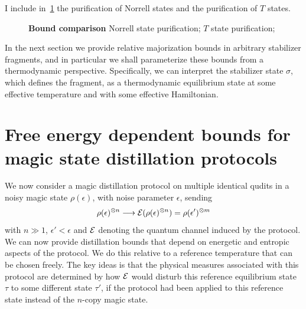 \documentclass[pra,
aps,
twocolumn,
superscriptaddress,
groupedaddress,
nofootinbib,
reprint
]{revtex4-1}
\begin{document}
I include in~\cref{fig:test} the purification of Norrell states and the purification of $T$ states.

\begin{figure}[h]
    \centering
    \hspace{8pt}%
    \caption{\textbf{Bound comparison} 
     Norrell state purification;  $T$ state purification;
    }%
    \label{fig:test}
\end{figure}

In the next section we provide relative majorization bounds in arbitrary stabilizer fragments, and in particular we shall parameterize these bounds from a thermodynamic perspective. Specifically, we can interpret the stabilizer state $\sigma$, which defines the fragment, as a thermodynamic equilibrium state at some effective temperature and with some effective Hamiltonian.

\section{Free energy dependent bounds for magic state distillation protocols}
\label{sec:stab}

We now consider a magic distillation protocol on multiple identical qudits in a noisy magic state $\rho(\epsilon)$, with noise parameter $\epsilon$, sending 
\begin{equation}
\rho(\epsilon)^{\otimes n} \longrightarrow \mathcal{E}(\rho(\epsilon)^{\otimes n}) =\rho(\epsilon')^{\otimes m}
\end{equation}
with $n \gg 1$, $\epsilon' <\epsilon$ and $\mathcal{E}$ denoting the quantum channel induced by the protocol. We can now provide distillation bounds that depend on energetic and entropic aspects of the protocol. We do this relative to a reference temperature that can be chosen freely. The key ideas is that the physical measures associated with this protocol are determined by how $\mathcal{E}$ would disturb this reference equilibrium state $\tau$ to some different state $\tau'$, if the protocol had been applied to this reference state instead of the $n$-copy magic state. 
\end{document}
